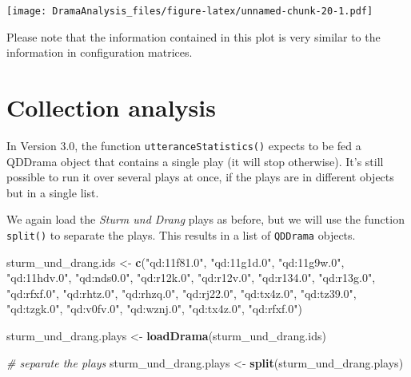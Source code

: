 \documentclass[]{book}
\newenvironment{Shaded}{\begin{snugshade}}{\end{snugshade}}
\newcommand{\CommentTok}[1]{\textcolor[rgb]{0.56,0.35,0.01}{\textit{#1}}}
\newcommand{\KeywordTok}[1]{\textcolor[rgb]{0.13,0.29,0.53}{\textbf{#1}}}
\newcommand{\NormalTok}[1]{#1}
\newcommand{\StringTok}[1]{\textcolor[rgb]{0.31,0.60,0.02}{#1}}
\begin{document}
\texttt{[image: DramaAnalysis\_files/figure-latex/unnamed-chunk-20-1.pdf]}

Please note that the information contained in this plot is very similar to the information in configuration matrices.

\hypertarget{who-how-often-collection}{%
\section{Collection analysis}\label{who-how-often-collection}}

In Version 3.0, the function \texttt{utteranceStatistics()} expects to be fed a QDDrama object that contains a single play (it will stop otherwise). It's still possible to run it over several plays at once, if the plays are in different objects but in a single list.

We again load the \emph{Sturm und Drang} plays as before, but we will use the function \texttt{split()} to separate the plays. This results in a list of \texttt{QDDrama} objects.

\begin{Shaded}
\begin{Highlighting}[]
\NormalTok{sturm_und_drang.ids <-}\StringTok{ }\KeywordTok{c}\NormalTok{(}\StringTok{"qd:11f81.0"}\NormalTok{, }\StringTok{"qd:11g1d.0"}\NormalTok{, }\StringTok{"qd:11g9w.0"}\NormalTok{, }
                         \StringTok{"qd:11hdv.0"}\NormalTok{, }\StringTok{"qd:nds0.0"}\NormalTok{,  }\StringTok{"qd:r12k.0"}\NormalTok{, }
                         \StringTok{"qd:r12v.0"}\NormalTok{,  }\StringTok{"qd:r134.0"}\NormalTok{,  }\StringTok{"qd:r13g.0"}\NormalTok{, }
                         \StringTok{"qd:rfxf.0"}\NormalTok{,  }\StringTok{"qd:rhtz.0"}\NormalTok{,  }\StringTok{"qd:rhzq.0"}\NormalTok{, }
                         \StringTok{"qd:rj22.0"}\NormalTok{,  }\StringTok{"qd:tx4z.0"}\NormalTok{,  }\StringTok{"qd:tz39.0"}\NormalTok{, }
                         \StringTok{"qd:tzgk.0"}\NormalTok{,  }\StringTok{"qd:v0fv.0"}\NormalTok{,  }\StringTok{"qd:wznj.0"}\NormalTok{, }
                         \StringTok{"qd:tx4z.0"}\NormalTok{,  }\StringTok{"qd:rfxf.0"}\NormalTok{)}

\NormalTok{sturm_und_drang.plays <-}\StringTok{ }\KeywordTok{loadDrama}\NormalTok{(sturm_und_drang.ids)}

\CommentTok{# separate the plays}
\NormalTok{sturm_und_drang.plays <-}\StringTok{ }\KeywordTok{split}\NormalTok{(sturm_und_drang.plays) }
\end{Highlighting}
\end{Shaded}
\end{document}
